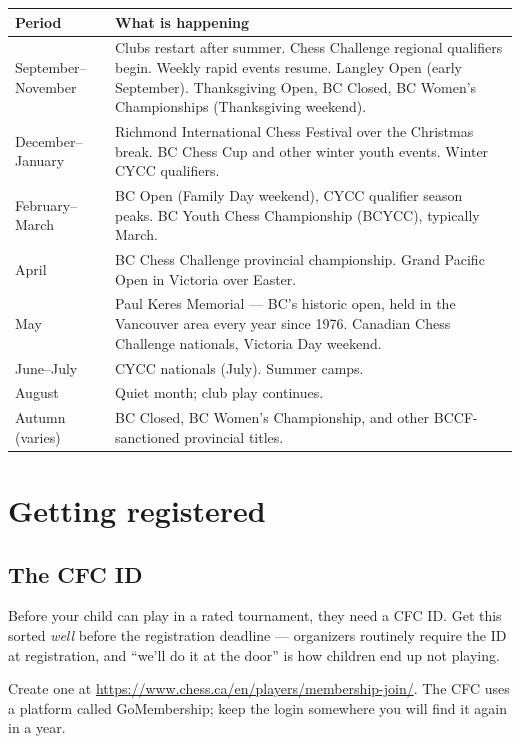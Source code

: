 \documentclass[10pt,letterpaper]{article}
\begin{document}
\begin{longtable}{@{}p{}p{}@{}}
\toprule
\textbf{Period} & \textbf{What is happening} \\
\midrule
\endhead
September--November & Clubs restart after summer. Chess Challenge regional
qualifiers begin. Weekly rapid events resume. Langley Open (early September). Thanksgiving Open, BC Closed, BC Women's Championships (Thanksgiving weekend). \\
December--January & Richmond International Chess Festival over the Christmas
break. BC Chess Cup and other winter youth events. Winter CYCC qualifiers. \\
February--March & BC Open (Family Day weekend), CYCC qualifier season peaks. BC Youth Chess Championship
(BCYCC), typically March. \\
April & BC Chess Challenge provincial championship. Grand Pacific Open in
Victoria over Easter. \\
May & Paul Keres Memorial --- BC's historic open, held in the Vancouver area
every year since 1976. Canadian Chess Challenge nationals, Victoria Day weekend. \\
June--July & CYCC nationals (July). Summer camps. \\
August & Quiet month; club play continues. \\
Autumn (varies) & BC Closed, BC Women's Championship, and other BCCF-sanctioned
provincial titles. \\
\bottomrule
\end{longtable}

\section{Getting registered}
\label{sec:admin}

\subsection{The CFC ID}

Before your child can play in a rated tournament, they need a CFC ID. Get this
sorted \emph{well} before the registration deadline --- organizers routinely
require the ID at registration, and ``we'll do it at the door'' is how children
end up not playing.

Create one at \url{https://www.chess.ca/en/players/membership-join/}. The CFC
uses a platform called GoMembership; keep the login somewhere you will find it
again in a year.
\end{document}
